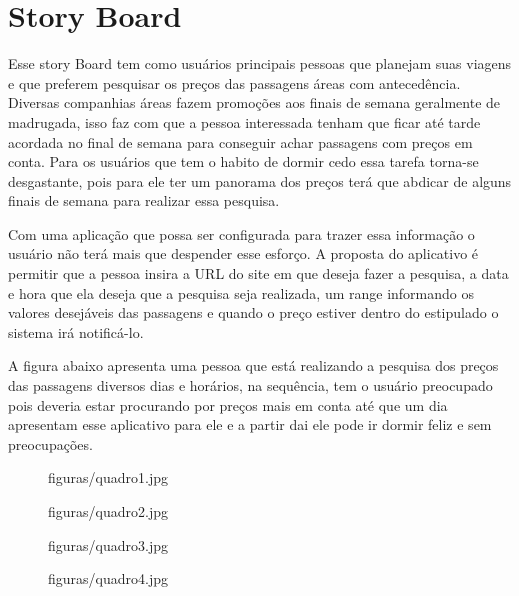 \chapter[Story Board]{Story Board}

Esse story Board tem como  usuários principais pessoas que planejam suas viagens e que preferem pesquisar os preços das passagens áreas com antecedência. Diversas companhias áreas fazem promoções aos finais de semana geralmente de madrugada, isso faz com que a pessoa interessada tenham que ficar até tarde acordada no final de semana para conseguir achar passagens com preços em conta. Para os usuários que tem o habito de dormir cedo essa tarefa torna-se desgastante, pois para ele ter um panorama dos preços terá que abdicar de alguns finais de semana para realizar essa pesquisa. 

Com uma aplicação que possa ser configurada para trazer essa informação o usuário não terá mais que  despender esse esforço. A proposta do aplicativo é permitir que a pessoa insira a URL do site em que deseja fazer a pesquisa, a data e hora que ela deseja que a pesquisa seja realizada, um range informando os valores desejáveis das passagens e quando o preço estiver dentro do estipulado o sistema irá notificá-lo. 

A figura abaixo apresenta uma pessoa que está realizando a pesquisa dos preços das passagens diversos  dias e horários, na sequência, tem o usuário preocupado pois deveria estar procurando por preços mais em conta até que um dia apresentam esse aplicativo para ele e a partir dai ele pode ir dormir feliz e sem preocupações.


\begin{figure}[h]
	\centering
	\label{fig01}{figuras/quadro1.jpg}
\end{figure}

\begin{figure}[h]
	\centering
	\label{fig01}{figuras/quadro2.jpg}
\end{figure}

\begin{figure}[h]
	\centering
	\label{fig01}{figuras/quadro3.jpg}
\end{figure}

\begin{figure}[h]
	\centering
	\label{fig01}{figuras/quadro4.jpg}
\end{figure}
